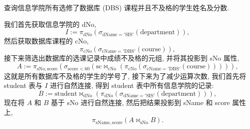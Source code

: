 \documentclass[10pt,UTF8]{book} %
\begin{document}
\begin{example}
    查询信息学院所有选修了数据库 (DBS) 课程并且不及格的学生姓名及分数.
    \begin{sol}
        我们首先获取信息学院的 dNo,
        \[ I := \pi_\mathrm{dNo} \left(
            \sigma_\mathrm{dName = 'SIS'} \left(
                \mathrm{department}
            \right)
        \right), \]
        然后获取数据库课程的 cNo,
        \[ \pi_\mathrm{cNo} \left(
            \sigma_\mathrm{cName = 'DBS'} \left(
                \mathrm{course}
            \right)
        \right), \]
        接下来筛选出数据库的选课记录中成绩不及格的元组,
        并将其投影到 sNo 属性,
        \[ A := \pi_\mathrm{sNo, score} \left(\sigma_\mathrm{score < 60} \left(\mathrm{sc} \Join_\mathrm{cNo} \left(
            \pi_\mathrm{cNo} \left(
            \sigma_\mathrm{cName = 'DBS'} \left(
                \mathrm{course}
            \right)
        \right)
        \right)\right)\right), \]
        这就是所有数据库不及格的学生的学号了, 接下来为了减少运算次数,
        我们首先将 student 表与 $I$
        进行自然连接, 得到 student 表中所有信息学院的记录:
        \[ B := \mathrm{student} \Join_\mathrm{dNo} \left(
            \pi_\mathrm{dNo} \left(
            \sigma_\mathrm{dName = 'SIS'} \left(
                \mathrm{department}
            \right)
        \right)
        \right),\]
        现在将 $A$ 和 $B$ 基于 sNo 进行自然连接,
        然后把结果投影到 sName 和 score 属性上,
        \[ \pi_\mathrm{sName, score} \left(
            A \Join_\mathrm{sNo} B
        \right). \]
    \end{sol}
\end{example}
\end{document}

